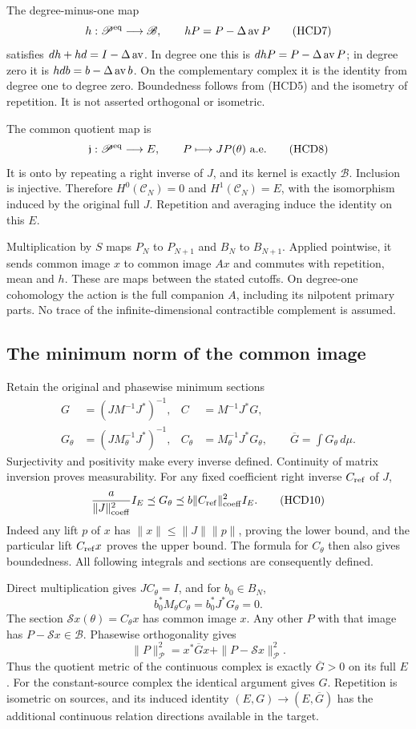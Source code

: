 The degree-minus-one map
\[
 h:\mathscr P^{\rm eq}\longrightarrow\mathscr B,\qquad
 hP=P-\Delta\operatorname{av} P
 \tag{HCD7}
\]
satisfies $dh+hd=I-\Delta\operatorname{av}$. In degree one this is
$dhP=P-\Delta\operatorname{av} P$; in degree zero it is
$hd b=b-\Delta\operatorname{av} b$. On the complementary complex it
is the identity from degree one to degree zero. Boundedness
follows from (HCD5) and the isometry of repetition.
It is not asserted orthogonal or isometric.

The common quotient map is
\[
 \mathfrak j:\mathscr P^{\rm eq}\longrightarrow E,\qquad
 P\longmapsto JP(\theta)\text{ a.e.}
 \tag{HCD8}
\]
It is onto by repeating a right inverse of $J$, and its
kernel is exactly $\mathscr B$. Inclusion is injective.
Therefore $H^0(\mathscr C_N)=0$ and $H^1(\mathscr C_N)=E$,
with the isomorphism induced by the original full $J$.
Repetition and averaging induce the identity on this $E$.

Multiplication by $S$ maps $P_N$ to $P_{N+1}$ and $B_N$
to $B_{N+1}$. Applied pointwise, it sends common image $x$
to common image $Ax$ and commutes with repetition, mean
and $h$. These are maps between the stated cutoffs.
On degree-one cohomology the action is the full companion
$A$, including its nilpotent primary parts. No trace of
the infinite-dimensional contractible complement is assumed.

\subsection{The minimum norm of the common image}

Retain the original and phasewise minimum sections
\[
 \begin{split}
 G&=(JM^{-1}J^*)^{-1},& C&=M^{-1}J^*G,\\
 G_\theta&=(JM_\theta^{-1}J^*)^{-1},&
 C_\theta&=M_\theta^{-1}J^*G_\theta,\qquad
 \overline G=\int G_\theta\,d\mu.
 \end{split}
 \tag{HCD9}
\]
Surjectivity and positivity make every inverse defined.
Continuity of matrix inversion proves measurability.
For any fixed coefficient right inverse $C_{\rm ref}$ of $J$,
\[
 \frac{a}{\|J\|_{\rm coeff}^2}I_E
 \preceq G_\theta
 \preceq b\|C_{\rm ref}\|_{\rm coeff}^2I_E.
 \tag{HCD10}
\]
Indeed any lift $p$ of $x$ has
$\|x\|\le\|J\|\|p\|$, proving the lower bound, and the
particular lift $C_{\rm ref}x$ proves the upper bound.
The formula for $C_\theta$ then also gives boundedness.
All following integrals and sections are consequently defined.

Direct multiplication gives $JC_\theta=I$, and for $b_0\in B_N$,
\[
 b_0^*M_\theta C_\theta=b_0^*J^*G_\theta=0.
 \tag{HCD11}
\]
The section $\mathscr Sx(\theta)=C_\theta x$ has common image
$x$. Any other $P$ with that image has
$P-\mathscr Sx\in\mathscr B$. Phasewise orthogonality gives
\[
 \|P\|_{\mathscr P}^2
 =x^*\overline Gx+\|P-\mathscr Sx\|_{\mathscr P}^2.
 \tag{HCD12}
\]
Thus the quotient metric of the continuous complex is exactly
$\overline G>0$ on its full $E$. For the constant-source
complex the identical argument gives $G$. Repetition is
isometric on sources, and its induced identity
$(E,G)\to(E,\overline G)$ has the additional continuous
relation directions available in the target.

